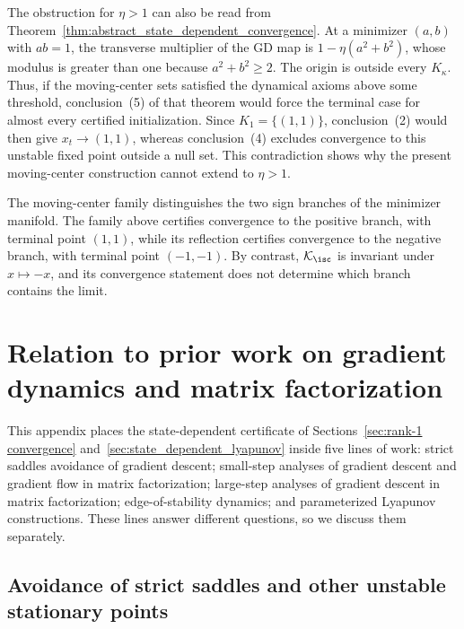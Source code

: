 \documentclass{article}
\begin{document}
The obstruction for $\eta>1$ can also be read from
Theorem~\ref{thm:abstract_state_dependent_convergence}. At a minimizer
$(a,b)$ with $ab=1$, the transverse multiplier of the GD map is
$1-\eta(a^2+b^2)$, whose modulus is greater than one because
$a^2+b^2\ge2$. The origin is outside every $K_\kappa$. Thus, if the
moving-center sets satisfied the dynamical axioms above some threshold,
conclusion~(5) of that theorem would force the terminal case for almost every
certified initialization. Since $K_1=\{(1,1)\}$, conclusion~(2) would then
give $x_t\to(1,1)$, whereas conclusion~(4) excludes convergence to this
unstable fixed point outside a null set. This contradiction shows why the
present moving-center construction cannot extend to $\eta>1$.

The moving-center family distinguishes the two sign branches of the minimizer
manifold. The family above certifies convergence to the positive branch, with
terminal point $(1,1)$, while its reflection certifies convergence to the
negative branch, with terminal point $(-1,-1)$. By contrast,
$\mathcal K_{\isc}$ is invariant under $x\mapsto-x$, and its convergence
statement does not determine which branch contains the limit.

\section{Relation to prior work on gradient dynamics and matrix factorization}
\label{apx:related_work}

This appendix places the state-dependent certificate of
Sections~\ref{sec:rank-1 convergence} and~\ref{sec:state_dependent_lyapunov}
inside five lines of work: strict saddles avoidance of gradient descent; small-step analyses of gradient descent and
gradient flow in matrix factorization; large-step analyses of gradient descent
in matrix factorization; edge-of-stability dynamics; and parameterized
Lyapunov constructions. These lines answer different questions, so
we discuss them separately.

\subsection{Avoidance of strict saddles and other unstable stationary points}
\label{subsec:rw_strict_saddle}
\end{document}
